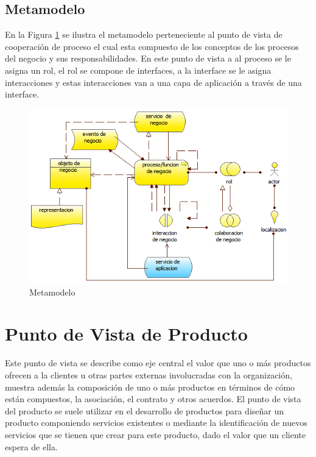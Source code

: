       \subsection{Metamodelo}
      En la Figura \ref{metamodelo5} se ilustra el metamodelo perteneciente al punto de vista de cooperación de proceso el cual esta compuesto de los conceptos de los procesos del negocio y sus responsabilidades. En este punto de vista a al proceso se le asigna un rol, el rol se compone de interfaces, a la interface se le asigna interacciones y estas interacciones van a una capa de aplicación a través de una interface. \cite{ref9}

      \begin{figure}[h]
      	\centering
      	\includegraphics{Imagenes/Metamodelos/05.png}
      	\caption{Metamodelo}
      	\label{metamodelo5}
      \end{figure}

      \section{Punto de Vista de Producto}
      Este punto de vista se describe como eje central el valor que uno o más productos ofrecen a la clientes u otras partes externas involucradas con la organización, muestra además la composición de uno o más productos en términos de cómo están compuestos, la asociación, el contrato y otros acuerdos. El punto de vista del producto se suele utilizar en el desarrollo de productos para diseñar un producto componiendo servicios existentes o mediante la identificación de nuevos servicios que se tienen que crear para este producto, dado el valor que un cliente espera de ella. \cite{ref9}

